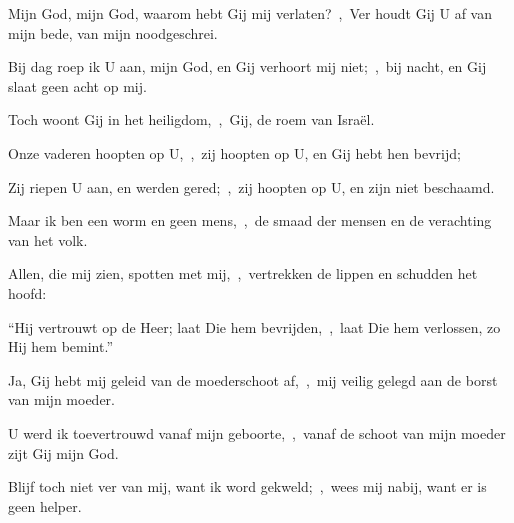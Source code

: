 \documentclass[12pt,twoside,a5paper]{article}
\begin{document}




\begin{halfparskip}
  Mijn God, mijn God, waarom hebt Gij mij verlaten?~\sep\ Ver houdt Gij U af van mijn bede, van mijn noodgeschrei.


  Bij dag roep ik U aan, mijn God, en Gij verhoort mij niet;~\sep\ bij nacht, en Gij slaat geen acht op mij.

  Toch woont Gij in het heiligdom,~\sep\ Gij, de roem van Israël.

  Onze vaderen hoopten op U,~\sep\ zij hoopten op U, en Gij hebt hen bevrijd;

  Zij riepen U aan, en werden gered;~\sep\ zij hoopten op U, en zijn niet beschaamd.
\end{halfparskip}


\begin{halfparskip}
  Maar ik ben een worm en geen mens,~\sep\ de smaad der mensen en de verachting van het volk.

  Allen, die mij zien, spotten met mij,~\sep\ vertrekken de lippen en schudden het hoofd:

  ``Hij vertrouwt op de Heer; laat Die hem bevrijden,~\sep\ laat Die hem verlossen, zo Hij hem bemint.''

  Ja, Gij hebt mij geleid van de moederschoot af,~\sep\ mij veilig gelegd aan de borst van mijn moeder.

  U werd ik toevertrouwd vanaf mijn geboorte,~\sep\ vanaf de schoot van mijn moeder zijt Gij mijn God.

  Blijf toch niet ver van mij, want ik word gekweld;~\sep\ wees mij nabij, want er is geen helper.
\end{halfparskip}

\end{document}

